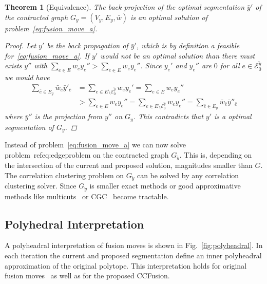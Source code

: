 \documentclass[10pt,twocolumn,letterpaper]{article}
\newtheorem{theorem}{Theorem}
\theoremstyle{definition}
\begin{document}
\begin{theorem}[Equivalence]\label{thm:Equivalence}
The back projection of the optimal segmentation $\bar{y}'$ of the contracted graph $G_y=(V_y,E_y, \bar{w})$
is an optimal solution of problem~\ref{eq:fusion_move_a}.
\begin{proof}
Let $y'$ be the back propagation of $\bar{y}'$, which is by definition a feasible for~\ref{eq:fusion_move_a}.
If $y'$ would not be an optimal solution than there must exists $y''$ with 
$\sum_{e\in E} w_ey_e'' > \sum_{e\in E} w_ey_e''$.
Since $y_e'$ and $y_e''$ are $0$ for all $e \in \mathcal{E}_0^{\breve{y}}$ we would have
\begin{align*}
  \sum_{\bar{e}\in E_y} \bar{w}_{\bar{e}}\bar{y}'_{\bar{e}}
 &= \sum_{e\in E \setminus \mathcal{E}_0^{\breve{y}}} w_ey_e'          
  = \sum_{e\in E} w_ey_e'' \\
 &> \sum_{e\in E} w_ey_e''
  = \sum_{e\in E \setminus \mathcal{E}_0^{\breve{y}}} w_ey_e''
  =\sum_{\bar{e}\in E_y} \bar{w}_{\bar{e}}\bar{y}''_{\bar{e}}
\end{align*}
where $\bar{y}''$ is the projection from $y''$ on $G_y$.
This contradicts that $y'$ is a optimal segmentation of $G_y$.
\end{proof}
%
\end{theorem}

Instead of problem~\ref{eq:fusion_move_a} we can now solve problem~ref{eq:edgeproblem} on the contracted graph $G_{\breve{y}}$.
This is, depending on the intersection of the current and proposed solution, magnitudes smaller than $G$.
The correlation clustering problem on $G_{\breve{y}}$ can be solved by any correlation clustering solver.
Since $G_{\breve{y}}$ is smaller exact methods or good approximative methods like 
multicuts~\cite{kappes_2013_arxiv} or CGC~\cite{beier_2014_cvpr}
become tractable.

%
%






\subsection{Polyhedral Interpretation}
A polyheadral interpretation of fusion moves is shown in Fig.~\ref{fig:polyheadral}.
In each iteration the current and proposed segmentation define an inner polyheadral 
approximation of the original polytope. This interpretation holds for original 
fusion moves~\cite{Lempitsky-2010} as well as for the proposed CCFusion.
\end{document}
